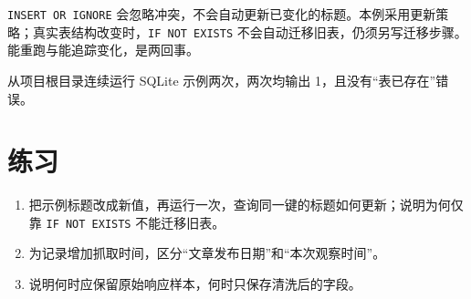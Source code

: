 \begin{warning}
\texttt{INSERT OR IGNORE} 会忽略冲突，不会自动更新已变化的标题。本例采用更新策略；真实表结构改变时，\texttt{IF NOT EXISTS} 不会自动迁移旧表，仍须另写迁移步骤。能重跑与能追踪变化，是两回事。
\end{warning}

\begin{tcolorbox}[title=本章验收,colframe=Teal,colback=Teal!3]
从项目根目录连续运行 SQLite 示例两次，两次均输出 1，且没有“表已存在”错误。
\end{tcolorbox}

\section{练习}
\begin{enumerate}[label=\arabic*.]
\item 把示例标题改成新值，再运行一次，查询同一键的标题如何更新；说明为何仅靠 \texttt{IF NOT EXISTS} 不能迁移旧表。
\item 为记录增加抓取时间，区分“文章发布日期”和“本次观察时间”。
\item 说明何时应保留原始响应样本，何时只保存清洗后的字段。
\end{enumerate}
